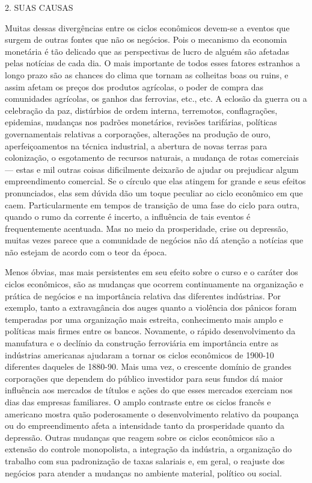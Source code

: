 \documentclass[12pt]{article}
\begin{document}
2. SUAS CAUSAS

Muitas dessas divergências entre os ciclos econômicos devem-se a eventos que surgem de outras fontes que não os negócios. Pois o mecanismo da economia monetária é tão delicado que as perspectivas de lucro de alguém são afetadas pelas notícias de cada dia. O mais importante de todos esses fatores estranhos a longo prazo são as chances do clima que tornam as colheitas boas ou ruins, e assim afetam os preços dos produtos agrícolas, o poder de compra das comunidades agrícolas, os ganhos das ferrovias, etc., etc. A eclosão da guerra ou a celebração da paz, distúrbios de ordem interna, terremotos, conflagrações, epidemias, mudanças nos padrões monetários, revisões tarifárias, políticas governamentais relativas a corporações, alterações na produção de ouro, aperfeiçoamentos na técnica industrial, a abertura de novas terras para colonização, o esgotamento de recursos naturais, a mudança de rotas comerciais — estas e mil outras coisas dificilmente deixarão de ajudar ou prejudicar algum empreendimento comercial. Se o círculo que elas atingem for grande e seus efeitos pronunciados, elas sem dúvida dão um toque peculiar ao ciclo econômico em que caem. Particularmente em tempos de transição de uma fase do ciclo para outra, quando o rumo da corrente é incerto, a influência de tais eventos é frequentemente acentuada. Mas no meio da prosperidade, crise ou depressão, muitas vezes parece que a comunidade de negócios não dá atenção a notícias que não estejam de acordo com o teor da época.

Menos óbvias, mas mais persistentes em seu efeito sobre o curso e o caráter dos ciclos econômicos, são as mudanças que ocorrem continuamente na organização e prática de negócios e na importância relativa das diferentes indústrias. Por exemplo, tanto a extravagância dos auges quanto a violência dos pânicos foram temperadas por uma organização mais estreita, conhecimento mais amplo e políticas mais firmes entre os bancos. Novamente, o rápido desenvolvimento da manufatura e o declínio da construção ferroviária em importância entre as indústrias americanas ajudaram a tornar os ciclos econômicos de 1900-10 diferentes daqueles de 1880-90. Mais uma vez, o crescente domínio de grandes corporações que dependem do público investidor para seus fundos dá maior influência aos mercados de títulos e ações do que esses mercados exerciam nos dias das empresas familiares. O amplo contraste entre os ciclos francês e americano mostra quão poderosamente o desenvolvimento relativo da poupança ou do empreendimento afeta a intensidade tanto da prosperidade quanto da depressão. Outras mudanças que reagem sobre os ciclos econômicos são a extensão do controle monopolista, a integração da indústria, a organização do trabalho com sua padronização de taxas salariais e, em geral, o reajuste dos negócios para atender a mudanças no ambiente material, político ou social.
\end{document}
